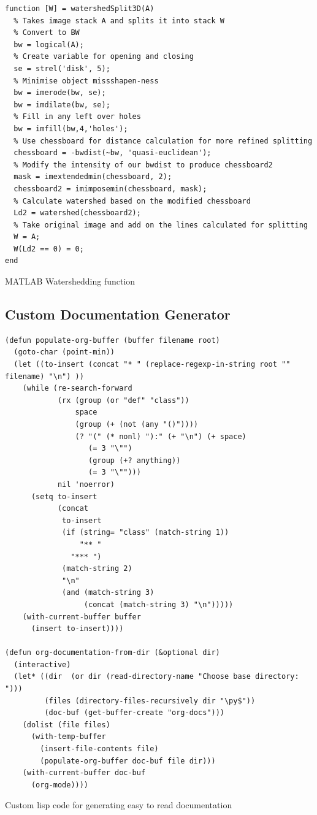 \documentclass[11pt]{report}
\begin{document}
\begin{listing}[H]
\begin{verbatim}
function [W] = watershedSplit3D(A)
  % Takes image stack A and splits it into stack W
  % Convert to BW
  bw = logical(A);
  % Create variable for opening and closing
  se = strel('disk', 5);
  % Minimise object missshapen-ness
  bw = imerode(bw, se);
  bw = imdilate(bw, se);
  % Fill in any left over holes
  bw = imfill(bw,4,'holes');
  % Use chessboard for distance calculation for more refined splitting
  chessboard = -bwdist(~bw, 'quasi-euclidean');
  % Modify the intensity of our bwdist to produce chessboard2
  mask = imextendedmin(chessboard, 2);
  chessboard2 = imimposemin(chessboard, mask);
  % Calculate watershed based on the modified chessboard
  Ld2 = watershed(chessboard2);
  % Take original image and add on the lines calculated for splitting
  W = A;
  W(Ld2 == 0) = 0;
end
\end{verbatim}
\caption{\label{lst:ws}MATLAB Watershedding function}
\end{listing}

\subsection{Custom Documentation Generator}
\label{sec-7-3-2}
\begin{listing}[H]
\begin{verbatim}
(defun populate-org-buffer (buffer filename root)
  (goto-char (point-min))
  (let ((to-insert (concat "* " (replace-regexp-in-string root "" filename) "\n") ))
    (while (re-search-forward
            (rx (group (or "def" "class"))
                space
                (group (+ (not (any "()"))))
                (? "(" (* nonl) "):" (+ "\n") (+ space)
                   (= 3 "\"")
                   (group (+? anything))
                   (= 3 "\"")))
            nil 'noerror)
      (setq to-insert
            (concat
             to-insert
             (if (string= "class" (match-string 1))
                 "** "
               "*** ")
             (match-string 2)
             "\n"
             (and (match-string 3)
                  (concat (match-string 3) "\n")))))
    (with-current-buffer buffer
      (insert to-insert))))

(defun org-documentation-from-dir (&optional dir)
  (interactive)
  (let* ((dir  (or dir (read-directory-name "Choose base directory: ")))
         (files (directory-files-recursively dir "\py$"))
         (doc-buf (get-buffer-create "org-docs")))
    (dolist (file files)
      (with-temp-buffer
        (insert-file-contents file)
        (populate-org-buffer doc-buf file dir)))
    (with-current-buffer doc-buf
      (org-mode))))
\end{verbatim}
\caption{\label{lst:docgen}Custom lisp code for generating easy to read documentation}
\end{listing}
\end{document}
